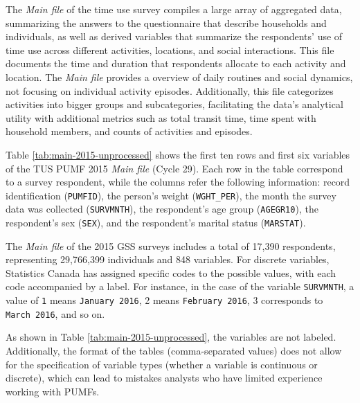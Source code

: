 \documentclass[Royal,times,sageh]{sagej}
\begin{document}
The \emph{Main file} of the time use survey compiles a large array of
aggregated data, summarizing the answers to the questionnaire that
describe households and individuals, as well as derived variables that
summarize the respondents' use of time use across different activities,
locations, and social interactions. This file documents the time and
duration that respondents allocate to each activity and location. The
\emph{Main file} provides a overview of daily routines and social
dynamics, not focusing on individual activity episodes. Additionally,
this file categorizes activities into bigger groups and subcategories,
facilitating the data's analytical utility with additional metrics such
as total transit time, time spent with household members, and counts of
activities and episodes.

Table \ref{tab:main-2015-unprocessed} shows the first ten rows and first
six variables of the TUS PUMF 2015 \emph{Main file} (Cycle 29). Each row
in the table correspond to a survey respondent, while the columns refer
the following information: record identification (\texttt{PUMFID}), the
person's weight (\texttt{WGHT\_PER}), the month the survey data was
collected (\texttt{SURVMNTH}), the respondent's age group
(\texttt{AGEGR10}), the respondent's sex (\texttt{SEX}), and the
respondent's marital status (\texttt{MARSTAT}).

The \emph{Main file} of the 2015 GSS surveys includes a total of 17,390
respondents, representing 29,766,399 individuals and 848 variables. For
discrete variables, Statistics Canada has assigned specific codes to the
possible values, with each code accompanied by a label. For instance, in
the case of the variable \texttt{SURVMNTH}, a value of \texttt{1} means
\texttt{January\ 2016}, 2 means \texttt{February\ 2016}, 3 corresponds
to \texttt{March\ 2016}, and so on.

As shown in Table \ref{tab:main-2015-unprocessed}, the variables are not
labeled. Additionally, the format of the tables (comma-separated values)
does not allow for the specification of variable types (whether a
variable is continuous or discrete), which can lead to mistakes analysts
who have limited experience working with PUMFs.

\begingroup\fontsize{8}{10}\selectfont
\end{document}
